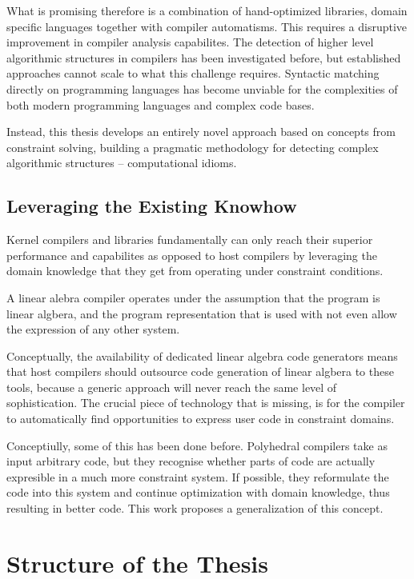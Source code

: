     What is promising therefore is a combination of hand-optimized libraries,
    domain specific languages together with compiler automatisms.
    This requires a disruptive improvement in compiler analysis capabilites.
    The detection of higher level algorithmic structures in compilers has been
    investigated before, but established approaches cannot scale to what
    this challenge requires.
    Syntactic matching directly on programming languages has become
    unviable for the complexities of both modern programming languages and
    complex code bases.

    Instead, this thesis develops an entirely novel approach based on concepts
    from constraint solving, building a pragmatic methodology for detecting
    complex algorithmic structures -- computational idioms.

    \subsection*{Leveraging the Existing Knowhow}
    Kernel compilers and libraries fundamentally can only reach their superior
    performance and capabilites as opposed to host compilers by leveraging the
    domain knowledge that they get from operating under constraint conditions.
    
    A linear alebra compiler operates under the assumption that the program is
    linear algbera, and the program representation that is used with not even
    allow the expression of any other system.

    Conceptually, the availability of dedicated linear algebra code generators
    means that host compilers should outsource code generation of linear algbera
    to these tools, because a generic approach will never reach the same level
    of sophistication.
    The crucial piece of technology that is missing, is for the compiler to
    automatically find opportunities to express user code in constraint
    domains.

    Conceptiully, some of this has been done before.
    Polyhedral compilers take as input arbitrary code, but they recognise whether
    parts of code are actually expresible in a much more constraint system.
    If possible, they reformulate the code into this system and continue
    optimization with domain knowledge, thus resulting in better code.
    This work proposes a generalization of this concept.



\pagebreak
\section{Structure of the Thesis}

